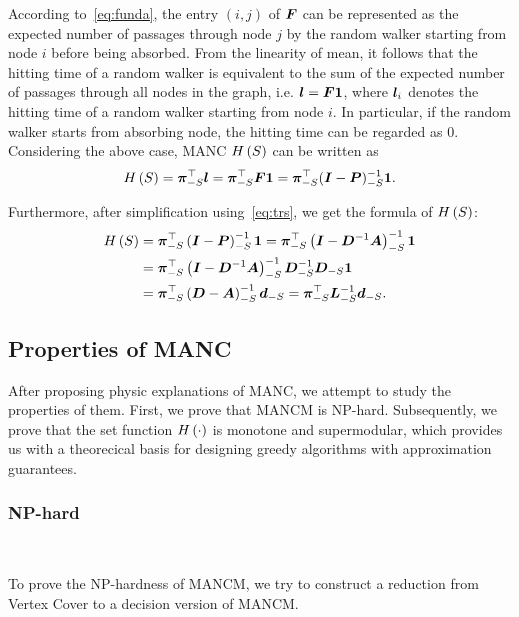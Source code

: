 \documentclass[sigconf]{acmart}
\begin{document}
According to~\eqref{eq:funda}, the entry \((i,j)\) of \(\boldsymbol{F}\) can be represented as the expected number of passages through node \(j\) by the random walker starting from node \(i\) before being absorbed.
From the linearity of mean, it follows that the hitting time of a random walker is equivalent to the sum of the expected number of passages through all nodes in the graph, i.e. \(\boldsymbol{l}=\boldsymbol{F}\boldsymbol{1}\), where \(\boldsymbol{l}_i\) denotes the hitting time of a random walker starting from node \(i\).
In particular, if the random walker starts from absorbing node, the hitting time can be regarded as \(0\).
Considering the above case, MANC \(H\left(S\right)\) can be written as
\[H\left(S\right)=\boldsymbol{\pi}_{-S}^\top\boldsymbol{l}=\boldsymbol{\pi}_{-S}^\top\boldsymbol{F}\boldsymbol{1}=\boldsymbol{\pi}_{-S}^\top(\boldsymbol{I}-\boldsymbol{P})_{-S}^{-1}\boldsymbol{1}.\]

Furthermore, after simplification using~\eqref{eq:trs}, we get the formula of \(H\left(S\right)\):
\begin{equation}\label{eq:MANC}
  \begin{split}
    H\left(S\right) & =\boldsymbol{\pi}_{-S}^\top\left( \boldsymbol{I}-\boldsymbol{P} \right)_{-S}^{-1}\boldsymbol{1}=\boldsymbol{\pi}_{-S}^\top\left( \boldsymbol{I}-\boldsymbol{D}^{-1}\boldsymbol{A} \right)_{-S}^{-1}\boldsymbol{1}                          \\
    & =\boldsymbol{\pi}_{-S}^\top\left( \boldsymbol{I}-\boldsymbol{D}^{-1}\boldsymbol{A} \right)_{-S}^{-1}\boldsymbol{D}_{-S}^{-1}\boldsymbol{D}_{-S}\boldsymbol{1} \\
    & =\boldsymbol{\pi}_{-S}^\top\left( \boldsymbol{D}-\boldsymbol{A} \right)_{-S}^{-1}\boldsymbol{d}_{-S}=\boldsymbol{\pi}_{-S}^\top\boldsymbol{L}_{-S}^{-1}\boldsymbol{d}_{-S}.
  \end{split}
\end{equation}

\subsection{Properties of MANC}

After proposing physic explanations of MANC, we attempt to study the properties of them. First, we prove that MANCM is NP-hard.
Subsequently, we prove that the set function \(H\left(\cdot\right)\) is monotone and supermodular, which provides us with a theorecical basis for designing greedy algorithms with approximation guarantees.

\subsubsection{NP-hard}

\

To prove the NP-hardness of MANCM, we try to construct a reduction from Vertex Cover to a decision version of MANCM.
\end{document}
